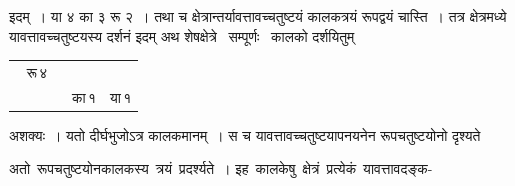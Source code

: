 \documentclass[11pt, openany]{book}
\begin{document}
\begin{flushleft}
\begin{minipage}[c]{0.52\textwidth}
इदम्~। या ४ का ३ रू २~। तथा च क्षेत्रान्तर्यावत्तावच्चतुष्टयं कालकत्रयं रूपद्वयं 
चास्ति~। तत्र क्षेत्रमध्ये यावत्तावच्चतुष्टयस्य दर्शनं इदम् अथ \;शेषक्षेत्रे ~सम्पूर्णः ~कालको \;दर्शयितुम्
\end{minipage} 
\hfill
\begin{minipage}{0.4\textwidth} 
\begin{tabular}{llllp{1.5cm}c}
\multicolumn{4}{c}{रू\,४}                                                                        &                                           & \multicolumn{1}{l}{} \\ \cline{1-5}
\multicolumn{1}{|l|}{} & \multicolumn{1}{l|}{} & \multicolumn{1}{l|}{} & \multicolumn{1}{l|}{} & \multicolumn{1}{l|}{\multirow{2}{*}{\hspace{2mm} का\,१}} & \multirow{2}{*}{या\,१} \\
\multicolumn{1}{|l|}{} & \multicolumn{1}{l|}{} & \multicolumn{1}{l|}{} & \multicolumn{1}{l|}{} & \multicolumn{1}{l|}{}                     &                      \\ \cline{1-5}
\end{tabular}
\end{minipage} 
\end{flushleft}
\vspace{-3mm}

\noindent अशक्यः~। यतो दीर्घभुजोऽत्र कालकमानम्~। स च यावत्तावच्चतुष्टयापनयनेन रूपचतुष्टयोनो दृश्यते
\newpage

\noindent अतो \,रूपचतुष्टयोनकालकस्य \,त्रयं \,प्रदर्श्यते~। इह \,कालकेषु \,क्षेत्रं \,प्रत्येकं \,यावत्तावदङ्क-
\vspace{-8mm}
\end{document}
